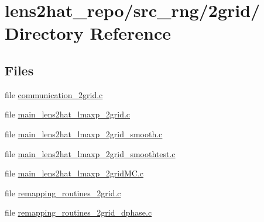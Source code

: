 \section{lens2hat\-\_\-repo/src\-\_\-rng/2grid/ Directory Reference}
\label{dir_a3a92a38e8597ccba9093f598aa1280a}
\subsection*{Files}
\begin{DoxyCompactItemize}
\item 
file \hyperlink{communication__2grid_8c}{communication\-\_\-2grid.\-c}
\item 
file \hyperlink{main__lens2hat__lmaxp__2grid_8c}{main\-\_\-lens2hat\-\_\-lmaxp\-\_\-2grid.\-c}
\item 
file \hyperlink{main__lens2hat__lmaxp__2grid__smooth_8c}{main\-\_\-lens2hat\-\_\-lmaxp\-\_\-2grid\-\_\-smooth.\-c}
\item 
file \hyperlink{main__lens2hat__lmaxp__2grid__smoothtest_8c}{main\-\_\-lens2hat\-\_\-lmaxp\-\_\-2grid\-\_\-smoothtest.\-c}
\item 
file \hyperlink{main__lens2hat__lmaxp__2gridMC_8c}{main\-\_\-lens2hat\-\_\-lmaxp\-\_\-2grid\-M\-C.\-c}
\item 
file \hyperlink{remapping__routines__2grid_8c}{remapping\-\_\-routines\-\_\-2grid.\-c}
\item 
file \hyperlink{remapping__routines__2grid__dphase_8c}{remapping\-\_\-routines\-\_\-2grid\-\_\-dphase.\-c}
\end{DoxyCompactItemize}
